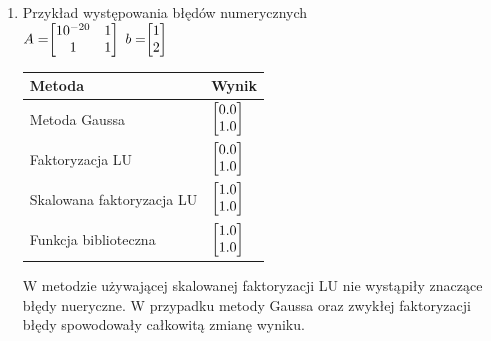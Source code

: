 \documentclass[11pt, a4paper]{article}
\begin{document}
\begin{enumerate}

\item Przykład występowania błędów numerycznych\\

\begin{math}
A = $$
\begin{bmatrix}
10^{-20}&1\\
1&1\\
\end{bmatrix}
$$
\end{math}
\begin{math}
b = $$
\begin{bmatrix}
1\\
2\\
\end{bmatrix}
$$
\end{math}

\begin{center}
    \begin{tabular}{| l | l |}
    \hline
    Metoda & Wynik\\ \hline
    Metoda Gaussa &  \begin{math}
$$
\begin{bmatrix}
0.0\\
1.0\\
\end{bmatrix}
$$
\end{math}\\ \hline
    Faktoryzacja LU & \begin{math}
    $$
\begin{bmatrix}
0.0\\
1.0\\
\end{bmatrix}
$$
\end{math}\\ \hline
    Skalowana faktoryzacja LU & \begin{math}
$$
\begin{bmatrix}
1.0\\
1.0\\
\end{bmatrix}
$$
\end{math}\\ \hline
    Funkcja biblioteczna& \begin{math}
$$
\begin{bmatrix}
1.0\\
1.0\\
\end{bmatrix}
$$
\end{math}\\ \hline
    \end{tabular}
\end{center}
W metodzie używającej skalowanej faktoryzacji LU nie wystąpiły znaczące błędy nueryczne. W przypadku metody Gaussa oraz zwykłej faktoryzacji błędy spowodowały całkowitą zmianę wyniku.\\



\end{enumerate}
\end{document}
